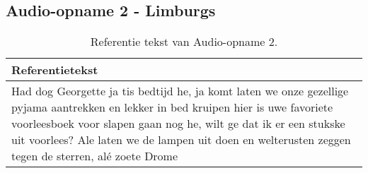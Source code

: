 \subsection{Audio-opname 2 - Limburgs}

\begin{table}[htbp]
    \centering
    \label{tab:groundtruth_sample2}
    \begin{tabularx}{\textwidth}{|X|}
        \hline
        \textbf{Referentietekst} \\
        
        \hline
        Had dog Georgette ja tis bedtijd he, ja komt laten we onze gezellige pyjama aantrekken en lekker in bed kruipen hier is uwe favoriete voorleesboek voor slapen gaan nog he, wilt ge dat ik er een stukske uit voorlees? Ale laten we de lampen uit doen en welterusten zeggen tegen de sterren, alé zoete Drome \\
        \hline
    \end{tabularx}
    \caption{Referentie tekst van Audio-opname 2.}
\end{table}

